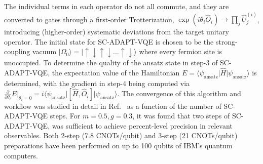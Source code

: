 \documentclass[aps, prc, tightenlines,superscriptaddress, letterpaper, amsmath, amssymb, preprintnumbers, floatfix, longbibliography, nofootinbib]{revtex4-2}
\begin{document}
The individual terms in each operator do not all commute, and they are converted to gates through a first-order Trotterization, ${\exp}(i \theta_i \hat{O}_i) \rightarrow \prod\limits_j \hat{U}_j^{(i)}$, introducing (higher-order) systematic deviations from the target unitary operator.
The initial state for SC-ADAPT-VQE is chosen to be the strong-coupling vacuum $|\Omega_0\rangle = \lvert\uparrow\downarrow\uparrow\downarrow \ldots\uparrow\downarrow\rangle$ where every fermion site is unoccupied. 
To determine the quality of the ansatz state in step-3 of SC-ADAPT-VQE, the expectation value of the Hamiltonian $E = \langle \psi_{{\text{ansatz}}} \vert \hat{H} \vert \psi_{{\text{ansatz}}} \rangle$ is determined, with the gradient in step-4 being computed via $\frac{\partial}{\partial\theta_i}\left. E \right|_{\theta_i=0} = i \langle \psi_{{\text{ansatz}}} \vert [\hat{H}, \hat{O}_i ] \vert \psi_{{\text{ansatz}}} \rangle$.
The convergence of this algorithm and workflow was studied in detail in Ref.~\cite{Farrell:2023fgd} as a function of the number of SC-ADAPT-VQE steps. 
For $m=0.5,g=0.3$, it was found that  two steps of SC-ADAPT-VQE, was sufficient to achieve percent-level precision in relevant observables. 
Both 2-step (7.8 CNOTs/qubit) and 3-step (21 CNOTs/qubit) preparations have been performed on up to 100 qubits of IBM's quantum computers.




\end{document}

